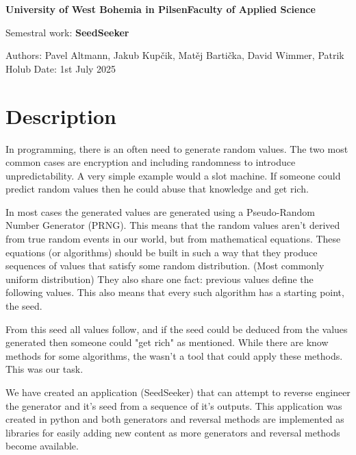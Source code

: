 \documentclass[12pt, a4paper]{report}
\begin{document}

\begin{center}
		\Large{\textbf{University of West Bohemia in Pilsen\break Faculty of Applied Science}}

		\vspace{\fill}
		\normalsize{Semestral work:\break}
		\Large{\textbf{SeedSeeker}}

		\vspace{\fill}
		\normalsize{Authors: Pavel Altmann, Jakub Kupčik,\hspace{\fill}\break
			Matěj Bartička, David Wimmer, Patrik Holub
		\hspace{\fill}Date: 1st July 2025}
\end{center}
\newpage

\setcounter{page}{2}
\tableofcontents
\newpage
\chapter{Description}
In programming, there is an often need to generate random values. The two most common cases are encryption and
including randomness to introduce unpredictability. A very simple example would a slot machine. If someone
could predict random values then he could abuse that knowledge and get rich.

In most cases the generated values are generated using a Pseudo-Random Number Generator (PRNG). This means
that the random values aren't derived from true random events in our world, but from mathematical equations.
These equations (or algorithms) should be built in such a way that they produce sequences of values that
satisfy some random distribution. (Most commonly uniform distribution) They also share one fact: previous values
define the following values. This also means that every such algorithm has a starting point, the seed. 

From this seed all values follow, and if the seed could be deduced from the values generated then someone could
"get rich" as mentioned. While there are know methods for some algorithms, the wasn't a tool that could apply these
methods. This was our task.

We have created an application (SeedSeeker) that can attempt to reverse engineer 
the generator and it's seed from a sequence of it's outputs. This application was created in python and both 
generators and reversal methods are implemented as libraries for easily adding new content as more generators and 
reversal methods become available.
\end{document}
